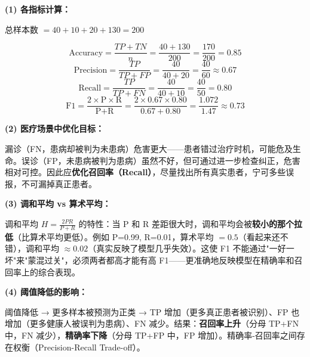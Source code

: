 \documentclass[a4paper,11pt]{ctexart}
\begin{document}
\begin{solutionbox}[参考答案与详细解析]
    \textbf{(1) 各指标计算：}

    总样本数 $= 40+10+20+130 = 200$

    \[
    \text{Accuracy} = \frac{TP+TN}{n} = \frac{40+130}{200} = \frac{170}{200} = \mathbf{0.85}
    \]
    \[
    \text{Precision} = \frac{TP}{TP+FP} = \frac{40}{40+20} = \frac{40}{60} \approx \mathbf{0.67}
    \]
    \[
    \text{Recall} = \frac{TP}{TP+FN} = \frac{40}{40+10} = \frac{40}{50} = \mathbf{0.80}
    \]
    \[
    \text{F1} = \frac{2 \times \text{P} \times \text{R}}{\text{P}+\text{R}} = \frac{2 \times 0.67 \times 0.80}{0.67+0.80} = \frac{1.072}{1.47} \approx \mathbf{0.73}
    \]

    \textbf{(2) 医疗场景中优化目标：}

    漏诊（FN，患病却被判为未患病）危害更大——患者错过治疗时机，可能危及生命。误诊（FP，未患病被判为患病）虽然不好，但可通过进一步检查纠正，危害相对可控。因此应\textbf{优化召回率（Recall）}，尽量找出所有真实患者，宁可多些误报，不可漏掉真正患者。

    \textbf{(3) 调和平均 vs 算术平均：}

    调和平均 $H = \frac{2PR}{P+R}$ 的特性：当 P 和 R 差距很大时，调和平均会被\textbf{较小的那个拉低}（比算术平均更低）。例如 P=0.99, R=0.01，算术平均 $= 0.5$（看起来还不错），调和平均 $\approx 0.02$（真实反映了模型几乎失效）。这使 F1 不能通过"一好一坏"来"蒙混过关"，必须两者都高才能有高 F1——更准确地反映模型在精确率和召回率上的综合表现。

    \textbf{(4) 阈值降低的影响：}

    阈值降低 → 更多样本被预测为正类 → TP 增加（更多真正患者被识别）、FP 也增加（更多健康人被误判为患病）、FN 减少。结果：\textbf{召回率上升}（分母 TP+FN 中，FN 减少），\textbf{精确率下降}（分母 TP+FP 中，FP 增加）。精确率-召回率之间存在权衡（Precision-Recall Trade-off）。
\end{solutionbox}
\end{document}
